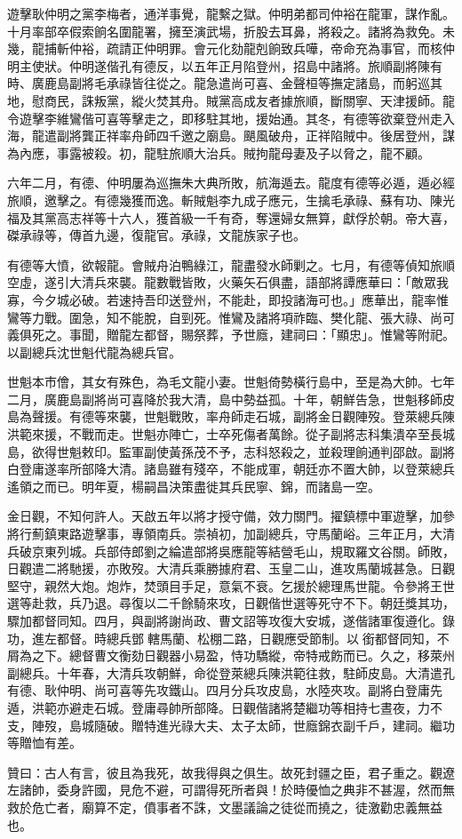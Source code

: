 \begin{pinyinscope}
遊擊耿仲明之黨李梅者，通洋事覺，龍繫之獄。仲明弟都司仲裕在龍軍，謀作亂。十月率部卒假索餉名圍龍署，擁至演武場，折股去耳鼻，將殺之。諸將為救免。未幾，龍捕斬仲裕，疏請正仲明罪。會元化劾龍剋餉致兵嘩，帝命充為事官，而核仲明主使狀。仲明遂偕孔有德反，以五年正月陷登州，招島中諸將。旅順副將陳有時、廣鹿島副將毛承祿皆往從之。龍急遣尚可喜、金聲桓等撫定諸島，而躬巡其地，慰商民，誅叛黨，縱火焚其舟。賊黨高成友者據旅順，斷關寧、天津援師。龍令遊擊李維鸞偕可喜等擊走之，即移駐其地，援始通。其冬，有德等欲棄登州走入海，龍遣副將龔正祥率舟師四千邀之廟島。颶風破舟，正祥陷賊中。後居登州，謀為內應，事露被殺。初，龍駐旅順大治兵。賊拘龍母妻及子以脅之，龍不顧。

六年二月，有德、仲明屢為巡撫朱大典所敗，航海遁去。龍度有德等必遁，遁必經旅順，邀擊之。有德幾獲而逸。斬賊魁李九成子應元，生擒毛承祿、蘇有功、陳光福及其黨高志祥等十六人，獲首級一千有奇，奪還婦女無算，獻俘於朝。帝大喜，磔承祿等，傳首九邊，復龍官。承祿，文龍族家子也。

有德等大憤，欲報龍。會賊舟泊鴨綠江，龍盡發水師剿之。七月，有德等偵知旅順空虛，遂引大清兵來襲。龍數戰皆敗，火藥矢石俱盡，語部將譚應華曰：「敵眾我寡，今夕城必破。若速持吾印送登州，不能赴，即投諸海可也。」應華出，龍率惟鸞等力戰。圍急，知不能脫，自剄死。惟鸞及諸將項祚臨、樊化龍、張大祿、尚可義俱死之。事聞，贈龍左都督，賜祭葬，予世廕，建祠曰：「顯忠」。惟鸞等附祀。以副總兵沈世魁代龍為總兵官。

世魁本市儈，其女有殊色，為毛文龍小妻。世魁倚勢橫行島中，至是為大帥。七年二月，廣鹿島副將尚可喜降於我大清，島中勢益孤。十年，朝鮮告急，世魁移師皮島為聲援。有德等來襲，世魁戰敗，率舟師走石城，副將金日觀陣歿。登萊總兵陳洪範來援，不戰而走。世魁亦陣亡，士卒死傷者萬餘。從子副將志科集潰卒至長城島，欲得世魁敕印。監軍副使黃孫茂不予，志科怒殺之，並殺理餉通判邵啟。副將白登庸遂率所部降大清。諸島雖有殘卒，不能成軍，朝廷亦不置大帥，以登萊總兵遙領之而已。明年夏，楊嗣昌決策盡徙其兵民寧、錦，而諸島一空。

金日觀，不知何許人。天啟五年以將才授守備，效力關門。擢鎮標中軍遊擊，加參將行薊鎮東路遊擊事，專領南兵。崇禎初，加副總兵，守馬蘭峪。三年正月，大清兵破京東列城。兵部侍郎劉之綸遣部將吳應龍等結營毛山，規取羅文谷關。師敗，日觀遣二將馳援，亦敗歿。大清兵乘勝據府君、玉皇二山，進攻馬蘭城甚急。日觀堅守，親然大炮。炮炸，焚頭目手足，意氣不衰。乞援於總理馬世龍。令參將王世選等赴救，兵乃退。尋復以二千餘騎來攻，日觀偕世選等死守不下。朝廷獎其功，驟加都督同知。四月，與副將謝尚政、曹文詔等攻復大安城，遂偕諸軍復遵化。錄功，進左都督。時總兵鄧轄馬蘭、松棚二路，日觀應受節制。以銜都督同知，不屑為之下。總督曹文衡劾日觀器小易盈，恃功驕縱，帝特戒飭而已。久之，移萊州副總兵。十年春，大清兵攻朝鮮，命從登萊總兵陳洪範往救，駐師皮島。大清遣孔有德、耿仲明、尚可喜等先攻鐵山。四月分兵攻皮島，水陸夾攻。副將白登庸先遁，洪範亦避走石城。登庸尋帥所部降。日觀偕諸將楚繼功等相持七晝夜，力不支，陣歿，島城隨破。贈特進光祿大夫、太子太師，世廕錦衣副千戶，建祠。繼功等贈恤有差。

贊曰：古人有言，彼且為我死，故我得與之俱生。故死封疆之臣，君子重之。觀遼左諸帥，委身許國，見危不避，可謂得死所者與！於時優恤之典非不甚渥，然而無救於危亡者，廟算不定，僨事者不誅，文墨議論之徒從而撓之，徒激勸忠義無益也。


\end{pinyinscope}